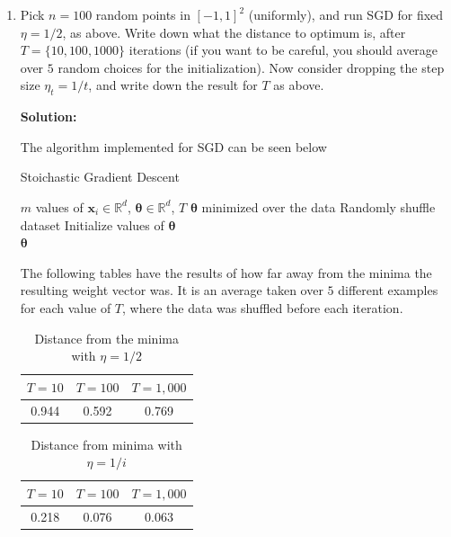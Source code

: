 \documentclass[12pt]{article}
\newcommand{\grad}{\nabla}
\renewcommand{\P}[1]{\left( #1 \right)}
\begin{document}
\begin{enumerate}
\begin{enumerate}
\item Pick $n = 100$ random points in $[-1, 1]^{2}$ (uniformly), and run SGD for fixed $\eta = 1/2$, as above. Write down what the distance to optimum is, after $T = \{ 10, 100, 1000\}$ iterations (if you want to be careful, you should average over $5$ random choices for the initialization). Now consider dropping the step size $\eta_{t} = 1/t$, and write down the result for $T$ as above.

      {\bf Solution:}

The algorithm implemented for SGD can be seen below

\begin{minipage}{\linewidth}
\begin{algorithm}[H]
\caption{Stoichastic Gradient Descent}\label{SGD}
\begin{algorithmic}[1]
\Input $m$ values of $\bm{x}_{i} \in \mathbb{R}^{d}$, $\bm{\theta} \in \mathbb{R}^{d}$, $T$
\Output $\bm{\theta}$ minimized over the data
\State Randomly shuffle dataset
\State Initialize values of $\bm{\theta}$
    \For{$i = 1, 2, \ldots, T$}{
      \State $\theta_{j}\gets \theta_{j} - \eta \grad_{\theta} J\P{\bm{\theta}, \bm{x}_{i}}$
      \Comment for every $j = \left\{ 0, 1, \ldots, \mathbb{R}^{d}\right\}$
    \EndFor}\\
\Return $\bm{\theta}$
\end{algorithmic}
\end{algorithm}
\end{minipage}

The following tables have the results of how far away from the minima the resulting weight vector was. It is an average taken over $5$ different examples for each value of $T$, where the data was shuffled before each iteration. 

\begin{table}[H]
\centering
\caption{Distance from the minima with $\eta = 1/2$}
\begin{tabular}{c c c}
\hline\hline
$T = 10$ & $T = 100$ & $T = 1,000$\\
\hline
0.944 & 0.592 & 0.769\\
\hline
\end{tabular}
\label{table:fix}
\end{table}

\begin{table}[H]
\centering
\caption{Distance from minima with $\eta = 1/i$}
\begin{tabular}{c c c}
\hline\hline
$T = 10$ & $T = 100$ & $T = 1,000$\\
\hline
0.218 & 0.076 & 0.063\\
\hline
\end{tabular}
\label{table:decay}
\end{table}



\end{enumerate}
\end{enumerate}
\end{document}
